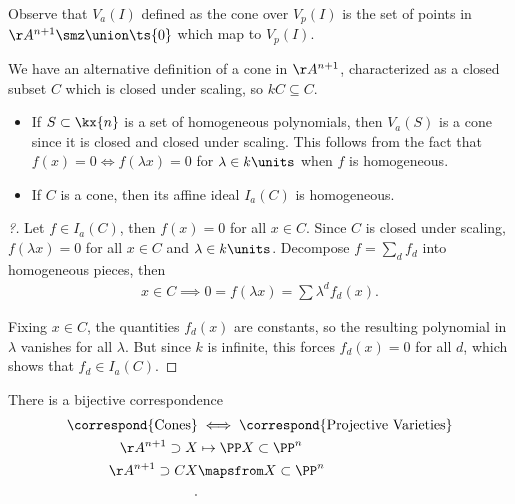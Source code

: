\begin{remark}

Observe that \(V_a(I)\) defined as the cone over \(V_p(I)\) is the set
of points in \(\AA^{n+1}\smz \union \ts{0}\) which map to \(V_p(I)\).

\end{remark}

We have an alternative definition of a cone in \(\AA^{n+1}\),
characterized as a closed subset \(C\) which is closed under scaling, so
\(kC\subseteq C\).

\begin{proposition}

\envlist

\begin{itemize}
\item
  If \(S\subset \kx{n}\) is a set of homogeneous polynomials, then
  \(V_a(S)\) is a cone since it is closed and closed under scaling. This
  follows from the fact that \(f(x) = 0 \iff f(\lambda x) = 0\) for
  \(\lambda \in k\units\) when \(f\) is homogeneous.
\item
  If \(C\) is a cone, then its affine ideal \(I_a(C)\) is homogeneous.
\end{itemize}

\end{proposition}

\begin{proof}[?]

Let \(f\in I_a(C)\), then \(f(x) = 0\) for all \(x\in C\). Since \(C\)
is closed under scaling, \(f(\lambda x) = 0\) for all \(x\in C\) and
\(\lambda \in k\units\). Decompose \(f = \sum_d f_d\) into homogeneous
pieces, then
\begin{align*}  
x\in C \implies 0 = f(\lambda x) = \sum \lambda^d f_d(x) 
.\end{align*}

Fixing \(x\in C\), the quantities \(f_d(x)\) are constants, so the
resulting polynomial in \(\lambda\) vanishes for all \(\lambda\). But
since \(k\) is infinite, this forces \(f_d(x) = 0\) for all \(d\), which
shows that \(f_d \in I_a(C)\).

\end{proof}

\begin{lemma}[?]

There is a bijective correspondence
\begin{align*}  
\correspond{\text{Cones}} 
&\iff
\correspond{\text{Projective Varieties}} \\
\AA^{n+1} \supset X &\mapsto \PP X\subset \PP^n \\
\AA^{n+1} \supset CX &\mapsfrom X\subset \PP^n \\
.\end{align*}

\end{lemma}

